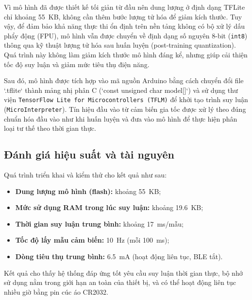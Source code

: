 Vì mô hình đã được thiết kế tối giản từ đầu nên dung lượng ở định dạng TFLite chỉ khoảng 55~KB, không cần thêm bước lượng tử hóa để giảm kích thước. Tuy vậy, để đảm bảo khả năng thực thi ổn định trên nền tảng không có bộ xử lý dấu phẩy động (FPU), mô hình vẫn được chuyển về định dạng số nguyên 8-bit (\texttt{int8}) thông qua kỹ thuật lượng tử hóa sau huấn luyện (post-training quantization). Quá trình này không làm giảm kích thước mô hình đáng kể, nhưng giúp cải thiện tốc độ suy luận và giảm mức tiêu thụ điện năng.

Sau đó, mô hình được tích hợp vào mã nguồn Arduino bằng cách chuyển đổi file `.tflite` thành mảng nhị phân C (`const unsigned char model[]`) và sử dụng thư viện \texttt{TensorFlow Lite for Microcontrollers (TFLM)} để khởi tạo trình suy luận (\texttt{MicroInterpreter}). Tín hiệu đầu vào từ cảm biến gia tốc được xử lý theo đúng chuẩn hóa đầu vào như khi huấn luyện và đưa vào mô hình để thực hiện phân loại tư thế theo thời gian thực.

\subsection{Đánh giá hiệu suất và tài nguyên}

Quá trình triển khai và kiểm thử cho kết quả như sau:

\begin{itemize}
    \item \textbf{Dung lượng mô hình (flash):} khoảng 55~KB;
    \item \textbf{Mức sử dụng RAM trong lúc suy luận:} khoảng 19.6~KB;
    \item \textbf{Thời gian suy luận trung bình:} khoảng 17~ms/mẫu;
    \item \textbf{Tốc độ lấy mẫu cảm biến:} 10~Hz (mỗi 100~ms);
    \item \textbf{Dòng tiêu thụ trung bình:} 6.5~mA (hoạt động liên tục, BLE tắt).
\end{itemize}

Kết quả cho thấy hệ thống đáp ứng tốt yêu cầu suy luận thời gian thực, bộ nhớ sử dụng nằm trong giới hạn an toàn của thiết bị, và có thể hoạt động liên tục nhiều giờ bằng pin cúc áo CR2032.



